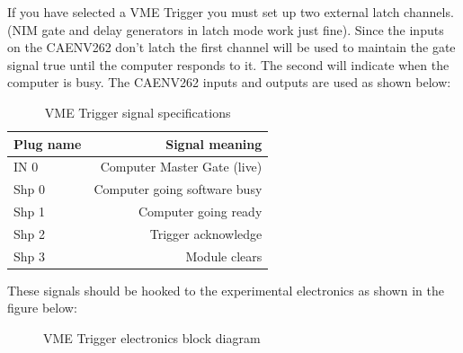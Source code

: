 	If you have selected a VME Trigger you must set
	up two external latch channels. (NIM gate and delay
	generators in latch mode work just fine).  Since
	the inputs on the CAENV262 don't latch the first channel
	will be used to maintain the gate signal true until the
	computer responds to it.  The second will indicate when the
	computer is busy. The CAENV262 inputs and outputs are used
        as shown below:
	\begin{table}[htb]
	 \caption{VME Trigger signal specifications}
	 \begin{tabular}{|l|r|}

	   \hline
	   {\bf Plug name} &   {\bf Signal meaning} \\
	   \hline
	   IN 0      &   Computer Master Gate (live) \\
	   Shp 0     &   Computer going software busy \\
	   Shp 1     &   Computer going ready \\
	   Shp 2     &   Trigger acknowledge  \\
	   Shp 3     &   Module clears        \\
	   \hline
	 \end{tabular}
	\end{table}
	
	 These signals should be hooked to the experimental electronics as shown
	 in the figure below:
	 
	 \begin{figure}[htb]
	    \caption{VME Trigger electronics block diagram}

	 \end{figure}
	
